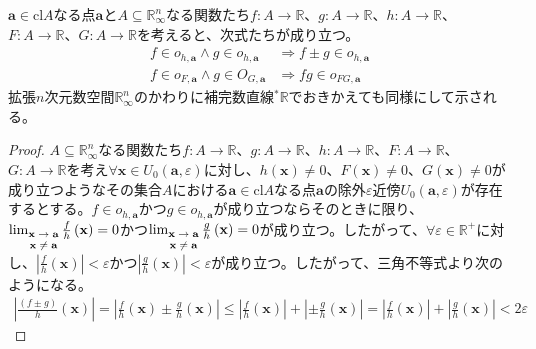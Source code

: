 \documentclass[dvipdfmx]{jsarticle}
\begin{document}
\begin{thm}\label{4.2.4.2}
$\mathbf{a} \in \mathrm{cl}A$なる点$\mathbf{a}$と$A \subseteq \mathbb{R}_{\infty}^{n}$なる関数たち$f:A \rightarrow \mathbb{R}$、$g:A \rightarrow \mathbb{R}$、$h:A \rightarrow \mathbb{R}$、$F:A \rightarrow \mathbb{R}$、$G:A \rightarrow \mathbb{R}$を考えると、次式たちが成り立つ。
\begin{align*}
f \in o_{h,\mathbf{a}} \land g \in o_{h,\mathbf{a}} &\Rightarrow f \pm g \in o_{h,\mathbf{a}}\\
f \in o_{F,\mathbf{a}} \land g \in O_{G,\mathbf{a}} &\Rightarrow fg \in o_{FG,\mathbf{a}}
\end{align*}
拡張$n$次元数空間$\mathbb{R}_{\infty}^{n}$のかわりに補完数直線${}^{*}\mathbb{R}$でおきかえても同様にして示される。
\end{thm}
\begin{proof}
$A \subseteq \mathbb{R}_{\infty}^{n}$なる関数たち$f:A \rightarrow \mathbb{R}$、$g:A \rightarrow \mathbb{R}$、$h:A \rightarrow \mathbb{R}$、$F:A \rightarrow \mathbb{R}$、$G:A \rightarrow \mathbb{R}$を考え$\forall\mathbf{x} \in U_{0}\left( \mathbf{a},\varepsilon \right)$に対し、$h\left( \mathbf{x} \right) \neq 0$、$F\left( \mathbf{x} \right) \neq 0$、$G\left( \mathbf{x} \right) \neq 0$が成り立つようなその集合$A$における$\mathbf{a} \in \mathrm{cl}A$なる点$\mathbf{a}$の除外$\varepsilon$近傍$U_{0}\left( \mathbf{a},\varepsilon \right)$が存在するとする。$f \in o_{h,\mathbf{a}}$かつ$g \in o_{h,\mathbf{a}}$が成り立つならそのときに限り、$\lim_{\scriptsize \begin{matrix}
\mathbf{x} \rightarrow \mathbf{a} \\
\mathbf{x} \neq \mathbf{a} \\
\end{matrix}}{\frac{f}{h}\left( \mathbf{x} \right)} = 0$かつ$\lim_{\scriptsize \begin{matrix}
\mathbf{x} \rightarrow \mathbf{a} \\
\mathbf{x} \neq \mathbf{a} \\
\end{matrix}}{\frac{g}{h}\left( \mathbf{x} \right)} = 0$が成り立つ。したがって、$\forall\varepsilon \in \mathbb{R}^{+}$に対し、$\left| \frac{f}{h}\left( \mathbf{x} \right) \right| < \varepsilon$かつ$\left| \frac{g}{h}\left( \mathbf{x} \right) \right| < \varepsilon$が成り立つ。したがって、三角不等式より次のようになる。
\begin{align*}
\left| \frac{(f \pm g)}{h}\left( \mathbf{x} \right) \right| = \left| \frac{f}{h}\left( \mathbf{x} \right) \pm \frac{g}{h}\left( \mathbf{x} \right) \right| \leq \left| \frac{f}{h}\left( \mathbf{x} \right) \right| + \left| \pm \frac{g}{h}\left( \mathbf{x} \right) \right| = \left| \frac{f}{h}\left( \mathbf{x} \right) \right| + \left| \frac{g}{h}\left( \mathbf{x} \right) \right| < 2\varepsilon

\end{align*}
\end{proof}
\end{document}
